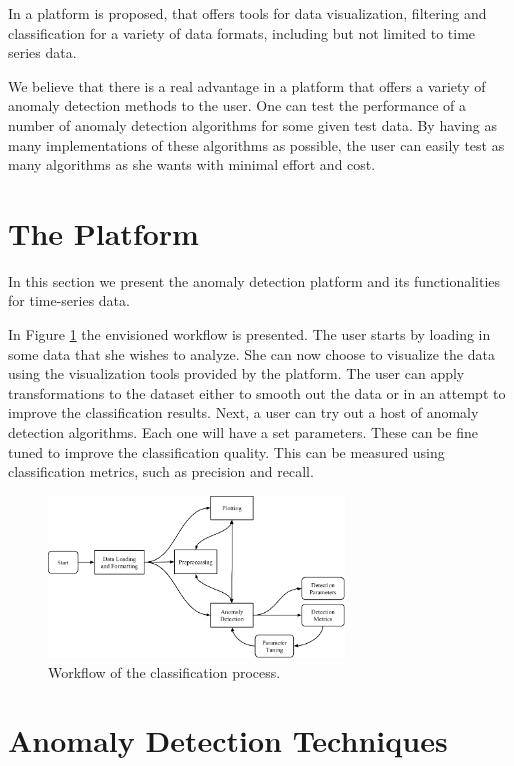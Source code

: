 \documentclass[a4paper, 10pt]{article}
\begin{document}
In \cite{tpad2018} a platform is proposed, that offers tools for data visualization, filtering and classification for a variety of data formats, including but not limited to time series data.

We believe that there is a real advantage in a platform that offers a variety of anomaly detection methods to the user. One can test the performance of a number of anomaly detection algorithms for some given test data. By having as many implementations of these algorithms as possible, the user can easily test as many algorithms as she wants with minimal effort and cost.

\section{The Platform \label{platform}}
 
In this section we present the anomaly detection platform and its functionalities for time-series data.

In Figure \ref{fig:workflow} the envisioned workflow is presented. The user starts by loading in some data that she wishes to analyze. She can now choose to visualize the data using the visualization tools provided by the platform. The user can apply transformations to the dataset either to smooth out the data or in an attempt to improve the classification results. Next, a user can try out a host of anomaly detection algorithms. Each one will have a set parameters. These can be fine tuned to improve the classification quality. This can be measured using classification metrics, such as precision and recall.

\begin{figure}
\centering
\includegraphics[width=0.7\textwidth]{Workflow}
\caption{Workflow of the classification process.}
\label{fig:workflow}
\end{figure}

\section{Anomaly Detection Techniques \label{methods}}
\end{document}
